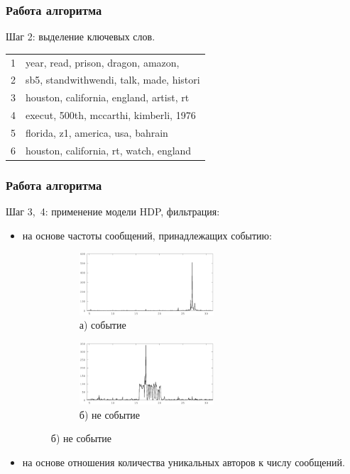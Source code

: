 \documentclass[10pt,pdf,hyperref={unicode}]{beamer}
\begin{document}
\begin{frame}
\frametitle{Работа алгоритма}
Шаг 2: выделение ключевых слов.
\begin{table}
\begin{tabular}{r | l}
1 & year, read, prison, dragon, amazon, \\
2 & sb5, standwithwendi, talk, made, histori \\
3 & houston, california, england, artist, rt \\
4 & execut, 500th, mccarthi, kimberli, 1976 \\
5 & florida, z1, america, usa, bahrain \\
6 & houston, california, rt, watch, england \\
\end{tabular}
\end{table}	
\end{frame}

\begin{frame}
\frametitle{Работа алгоритма}
Шаг 3,\ 4: применение модели HDP, фильтрация:
\begin{itemize}
\item на основе частоты сообщений, принадлежащих событию:
\begin{figure}[H]
\centering
\begin{subfigure}[b]{0.45 \textwidth}
	  \centering
	  \includegraphics[width=5.0cm]{all-freq-27-0-1.eps}	
  	  \caption*{а) событие}
  \end{subfigure}
  \begin{subfigure}[b]{0.45 \textwidth}
	  \centering
	  \includegraphics[width=5.0cm]{all-freq-17-2-1.eps}	
  	  \caption*{б) не событие}
  \end{subfigure}
\end{figure}
\item на основе отношения количества уникальных авторов к числу сообщений.
\end{itemize}
\end{frame}
\end{document}
